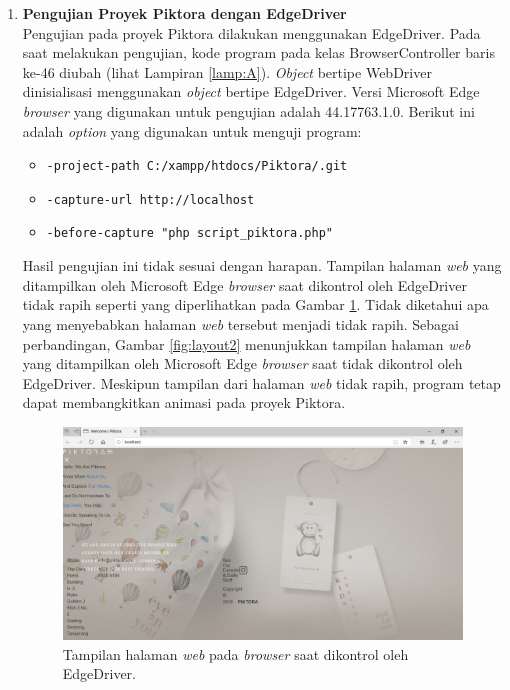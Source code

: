 \begin{enumerate}
\item \textbf{Pengujian Proyek Piktora dengan EdgeDriver}\\
Pengujian pada proyek Piktora dilakukan menggunakan EdgeDriver. Pada saat melakukan pengujian, kode program pada kelas BrowserController baris ke-46  diubah (lihat Lampiran \ref{lamp:A}). \textit{Object} bertipe WebDriver dinisialisasi menggunakan \textit{object} bertipe EdgeDriver. Versi Microsoft Edge \textit{browser} yang digunakan untuk pengujian adalah 44.17763.1.0. Berikut ini adalah \textit{option} yang digunakan untuk menguji program:
\begin{itemize}
\item \texttt{-project-path C:/xampp/htdocs/Piktora/.git}
\item \texttt{-capture-url http://localhost}
\item \texttt{-before-capture "php script\_piktora.php"}
\end{itemize}
Hasil pengujian ini tidak sesuai dengan harapan. Tampilan halaman \textit{web} yang ditampilkan oleh Microsoft Edge \textit{browser} saat dikontrol oleh EdgeDriver tidak rapih seperti yang diperlihatkan pada Gambar \ref{fig:layout1}. Tidak diketahui apa yang menyebabkan halaman \textit{web} tersebut menjadi tidak rapih. Sebagai perbandingan, Gambar \ref{fig:layout2} menunjukkan tampilan halaman \textit{web} yang ditampilkan oleh Microsoft Edge \textit{browser} saat tidak dikontrol oleh EdgeDriver. Meskipun tampilan dari halaman \textit{web} tidak rapih, program tetap dapat membangkitkan animasi pada proyek Piktora.    

\begin{figure}[H]
	\centering
		\includegraphics[scale=0.4]{Gambar/Layout_dengan_Edge_Driver.png}
	\caption{Tampilan halaman \textit{web} pada \textit{browser} saat dikontrol oleh EdgeDriver.}
	\label{fig:layout1}
\end{figure}


\end{enumerate}
